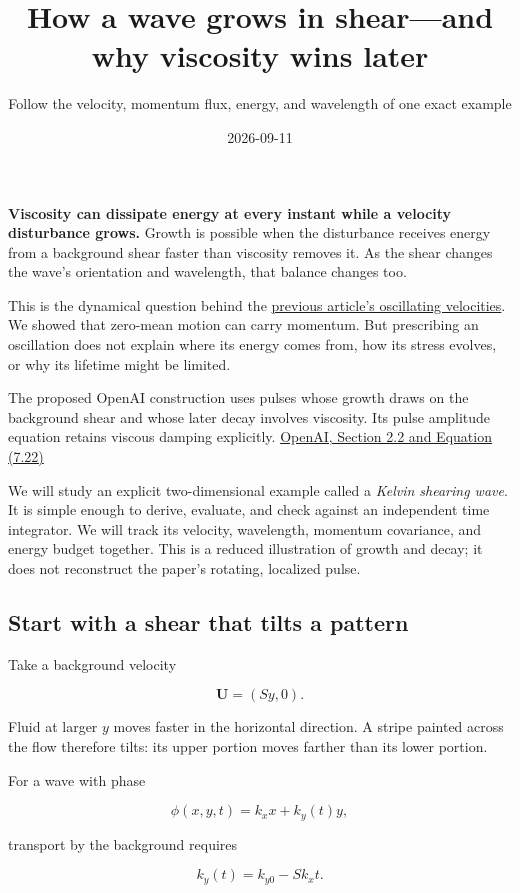 \documentclass[
  english,
  11pt,
]{article}
\title{How a wave grows in shear---and why viscosity wins later}
\subtitle{Follow the velocity, momentum flux, energy, and wavelength of
one exact example}
\author{}
\date{2026-09-11}
\begin{document}
\maketitle


\textbf{Viscosity can dissipate energy at every instant while a velocity
disturbance grows.} Growth is possible when the disturbance receives
energy from a background shear faster than viscosity removes it. As the
shear changes the wave's orientation and wavelength, that balance
changes too.

This is the dynamical question behind the
\href{../d4_mean_stress/article.html}{previous article's oscillating
velocities}. We showed that zero-mean motion can carry momentum. But
prescribing an oscillation does not explain where its energy comes from,
how its stress evolves, or why its lifetime might be limited.

The proposed OpenAI construction uses pulses whose growth draws on the
background shear and whose later decay involves viscosity. Its pulse
amplitude equation retains viscous damping explicitly.
\href{https://cdn.openai.com/pdf/32d9f210-8b73-45e0-91bc-82a30aef8a9a/navier-stokes.pdf}{OpenAI,
Section 2.2 and Equation (7.22)}

We will study an explicit two-dimensional example called a \emph{Kelvin
shearing wave}. It is simple enough to derive, evaluate, and check
against an independent time integrator. We will track its velocity,
wavelength, momentum covariance, and energy budget together. This is a
reduced illustration of growth and decay; it does not reconstruct the
paper's rotating, localized pulse.

\subsection{Start with a shear that tilts a
pattern}\label{start-with-a-shear-that-tilts-a-pattern}

Take a background velocity

\[
\mathbf U=(Sy,0).
\]

Fluid at larger \(y\) moves faster in the horizontal direction. A stripe
painted across the flow therefore tilts: its upper portion moves farther
than its lower portion.

For a wave with phase

\[
\phi(x,y,t)=k_xx+k_y(t)y,
\]

transport by the background requires

\[
k_y(t)=k_{y0}-Sk_xt.
\]
\end{document}
